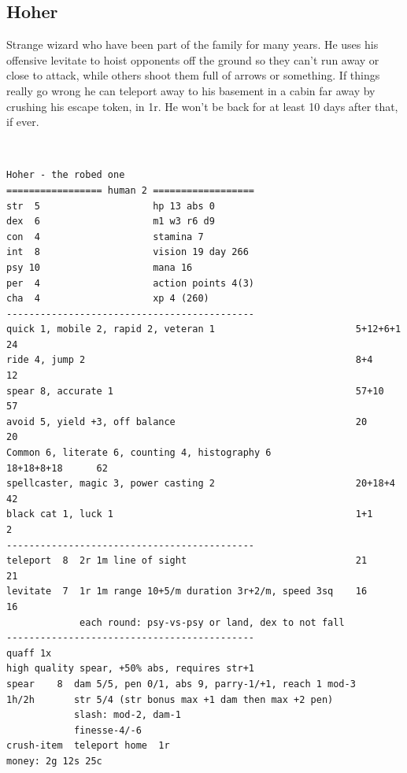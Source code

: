 \clearpage
\begin{samepage}
\subsection*{Hoher}
Strange wizard who have been part of the family for many years.
He uses his offensive levitate to hoist opponents off the ground so they can't run away or close to attack, while others shoot them full of arrows or something. If things really go wrong he can teleport away to his basement in a cabin far away by crushing his escape token, in 1r. He won't be back for at least 10 days after that, if ever.

\

\small \begin{verbatim}
Hoher - the robed one
================= human 2 ==================
str  5                    hp 13 abs 0
dex  6                    m1 w3 r6 d9
con  4                    stamina 7
int  8                    vision 19 day 266
psy 10                    mana 16
per  4                    action points 4(3)
cha  4                    xp 4 (260)
--------------------------------------------
quick 1, mobile 2, rapid 2, veteran 1                         5+12+6+1        24
ride 4, jump 2                                                8+4             12
spear 8, accurate 1                                           57+10           57
avoid 5, yield +3, off balance                                20              20
Common 6, literate 6, counting 4, histography 6               18+18+8+18      62
spellcaster, magic 3, power casting 2                         20+18+4         42
black cat 1, luck 1                                           1+1              2
--------------------------------------------
teleport  8  2r 1m line of sight                              21              21
levitate  7  1r 1m range 10+5/m duration 3r+2/m, speed 3sq    16              16
             each round: psy-vs-psy or land, dex to not fall
--------------------------------------------
quaff 1x
high quality spear, +50% abs, requires str+1
spear    8  dam 5/5, pen 0/1, abs 9, parry-1/+1, reach 1 mod-3
1h/2h       str 5/4 (str bonus max +1 dam then max +2 pen)
            slash: mod-2, dam-1
            finesse-4/-6
crush-item  teleport home  1r
money: 2g 12s 25c
\end{verbatim} \normalsize
\end{samepage}









